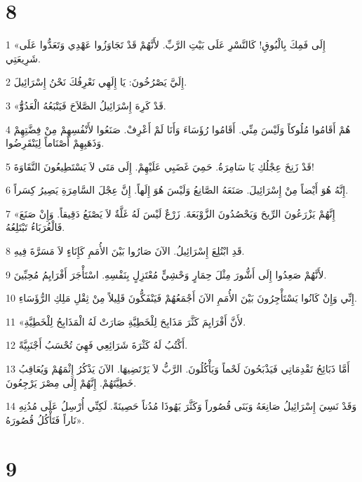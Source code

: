 \chapter{8}

\par 1 «إِلَى فَمِكَ بِالْبُوقِ! كَالنَّسْرِ عَلَى بَيْتِ الرَّبِّ. لأَنَّهُمْ قَدْ تَجَاوَزُوا عَهْدِي وَتَعَدُّوا عَلَى شَرِيعَتِي.
\par 2 إِلَيَّ يَصْرُخُونَ: يَا إِلَهِي نَعْرِفُكَ نَحْنُ إِسْرَائِيلَ.
\par 3 «قَدْ كَرِهَ إِسْرَائِيلُ الصَّلاَحَ فَيَتْبَعُهُ الْعَدُوُّّ.
\par 4 هُمْ أَقَامُوا مُلُوكاً وَلَيْسَ مِنِّي. أَقَامُوا رُؤَسَاءَ وَأَنَا لَمْ أَعْرِفْ. صَنَعُوا لأَنْفُسِهِمْ مِنْ فِضَّتِهِمْ وَذَهَبِهِمْ أَصْنَاماً لِيَنْقَرِضُوا.
\par 5 قَدْ زَنِخَ عِجْلُكِ يَا سَامِرَةُ. حَمِيَ غَضَبِي عَلَيْهِمْ. إِلَى مَتَى لاَ يَسْتَطِيعُونَ النَّقَاوَةَ!
\par 6 إِنَّهُ هُوَ أَيْضاً مِنْ إِسْرَائِيلَ. صَنَعَهُ الصَّانِعُ وَلَيْسَ هُوَ إِلَهاً. إِنَّ عِجْلَ السَّامِرَةِ يَصِيرُ كِسَراً.
\par 7 «إِنَّهُمْ يَزْرَعُونَ الرِّيحَ وَيَحْصُدُونَ الزَّوْبَعَةَ. زَرْعٌ لَيْسَ لَهُ غَلَّةٌ لاَ يَصْنَعُ دَقِيقاً. وَإِنْ صَنَعَ فَالْغُرَبَاءُ تَبْتَلِعُهُ.
\par 8 قَدِ ابْتُلِعَ إِسْرَائِيلُ. الآنَ صَارُوا بَيْنَ الأُمَمِ كَإِنَاءٍ لاَ مَسَرَّةَ فِيهِ.
\par 9 لأَنَّهُمْ صَعِدُوا إِلَى أَشُّورَ مِثْلَ حِمَارٍ وَحْشِيٍّ مُعْتَزِلٍ بِنَفْسِهِ. اسْتَأْجَرَ أَفْرَايِمُ مُحِبِّينَ.
\par 10 إِنِّي وَإِنْ كَانُوا يَسْتَأْجِرُونَ بَيْنَ الأُمَمِ الآنَ أَجْمَعُهُمْ فَيَنْفَكُّونَ قَلِيلاً مِنْ ثِقْلِ مَلِكِ الرُّؤَسَاءِ.
\par 11 «لأَنَّ أَفْرَايِمَ كَثَّرَ مَذَابِحَ لِلْخَطِيَّةِ صَارَتْ لَهُ الْمَذَابِحُ لِلْخَطِيَّةِ.
\par 12 أَكْتُبُ لَهُ كَثْرَةَ شَرَائِعِي فَهِيَ تُحْسَبُ أَجْنَبِيَّةً.
\par 13 أَمَّا ذَبَائِحُ تَقْدِمَاتِي فَيَذْبَحُونَ لَحْماً وَيَأْكُلُونَ. الرَّبُّ لاَ يَرْتَضِيهَا. الآنَ يَذْكُرُ إِثْمَهُمْ وَيُعَاقِبُ خَطِيَّتَهُمْ. إِنَّهُمْ إِلَى مِصْرَ يَرْجِعُونَ.
\par 14 وَقَدْ نَسِيَ إِسْرَائِيلُ صَانِعَهُ وَبَنَى قُصُوراً وَكَثَّرَ يَهُوذَا مُدُناً حَصِينَةً. لَكِنِّي أُرْسِلُ عَلَى مُدُنِهِ نَاراً فَتَأْكُلُ قُصُورَهُ».

\chapter{9}

